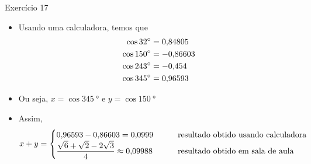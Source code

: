 \tikzset{fixed point arithmetic}
\newcommand{\bob}[1]{\pgfmathparse{#1}\pgfmathprintnumber[use comma, precision=6]{\pgfmathresult}}

\begin{frame}{Exercício 17}
    \begin{itemize}
        \item Usando uma calculadora, temos que
            \begin{align*}
                \cos{\SI{32}{\degree}} &= \bob{cos(32)}\\
                \cos{\SI{150}{\degree}} &= \bob{cos(150)}\\
                \cos{\SI{243}{\degree}} &= \bob{cos(243)}\\
                \cos{\SI{345}{\degree}} &= \bob{cos(345)} 
            \end{align*}
        \item Ou seja, \(x=\cos{\SI{345}{\degree}}\) e \(y=\cos{\SI{150}{\degree}}\)
        \item Assim, 
            \[
                x+y=
                \begin{cases}
                    \bob{cos(345)}-\bob{-cos(150)} = \bob{cos(345)+cos(150)} \qquad &\text{resultado obtido usando calculadora}\\
                    \dfrac{\sqrt{6}+\sqrt{2}-2\sqrt{3}}{4} \approx \bob{(sqrt(6)+sqrt(2)-2*sqrt(3))/4} \qquad &\text{resultado obtido em sala de aula}
                \end{cases}
            \]
    \end{itemize}
\end{frame}

